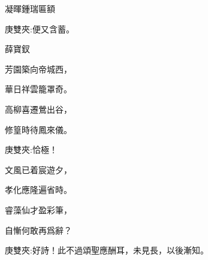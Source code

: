 \begin{poem}
    \begin{pl}凝暉鍾瑞匾額\end{pl}
    \begin{note}庚雙夾:便又含蓄。\end{note} \begin{pl}薛寶釵\end{pl}

    \begin{pl}芳園築向帝城西，\end{pl}

    \begin{pl}華日祥雲籠罩奇。\end{pl}

    \begin{pl}高柳喜遷鶯出谷，\end{pl}

    \begin{pl}修篁時待鳳來儀。\end{pl}
    \begin{note}庚雙夾:恰極！\end{note}

    \begin{pl}文風已着宸遊夕，\end{pl}

    \begin{pl}孝化應隆遍省時。\end{pl}

    \begin{pl}睿藻仙才盈彩筆，\end{pl}

    \begin{pl}自慚何敢再爲辭？\end{pl}
    \begin{note}庚雙夾:好詩！此不過頌聖應酬耳，未見長，以後漸知。\end{note}

\end{poem}



